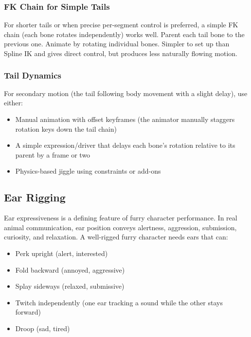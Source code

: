 \subsubsection{FK Chain for Simple Tails}

For shorter tails or when precise per-segment control is preferred, a simple FK chain (each bone rotates independently) works well. Parent each tail bone to the previous one. Animate by rotating individual bones. Simpler to set up than Spline IK and gives direct control, but produces less naturally flowing motion.

\subsubsection{Tail Dynamics}

For secondary motion (the tail following body movement with a slight delay), use either:
\begin{itemize}[leftmargin=2em]
  \item Manual animation with offset keyframes (the animator manually staggers rotation keys down the tail chain)
  \item A simple expression/driver that delays each bone's rotation relative to its parent by a frame or two
  \item Physics-based jiggle using constraints or add-ons
\end{itemize}


\subsection{Ear Rigging}

Ear expressiveness is a defining feature of furry character performance. In real animal communication, ear position conveys alertness, aggression, submission, curiosity, and relaxation. A well-rigged furry character needs ears that can:

\begin{itemize}[leftmargin=2em]
  \item Perk upright (alert, interested)
  \item Fold backward (annoyed, aggressive)
  \item Splay sideways (relaxed, submissive)
  \item Twitch independently (one ear tracking a sound while the other stays forward)
  \item Droop (sad, tired)
\end{itemize}

